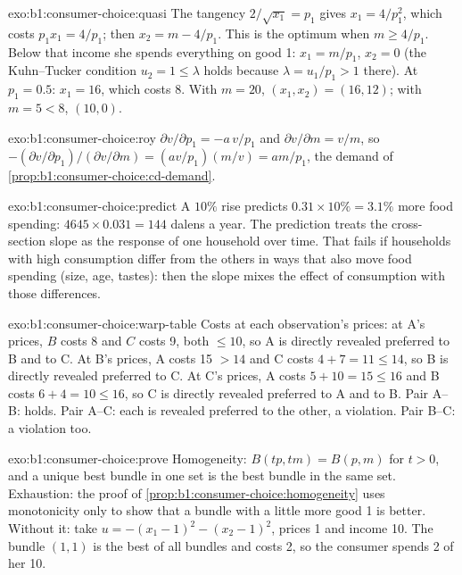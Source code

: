 \begin{solution}{exo:b1:consumer-choice:quasi}
The tangency $2/\sqrt{x_1} = p_1$ gives $x_1 = 4/p_1^2$, which costs
$p_1x_1 = 4/p_1$; then $x_2 = m - 4/p_1$. This is the optimum when
$m \ge 4/p_1$. Below that income she spends everything on good 1:
$x_1 = m/p_1$, $x_2 = 0$ (the Kuhn--Tucker condition $u_2 = 1 \le \lambda$ holds
because $\lambda = u_1/p_1 > 1$ there). At $p_1 = 0.5$: $x_1 = 16$, which costs 8.
With $m = 20$, $(x_1, x_2) = (16, 12)$; with $m = 5 < 8$, $(10, 0)$.
\end{solution}

\begin{solution}{exo:b1:consumer-choice:roy}
$\partial v/\partial p_1 = -a\,v/p_1$ and $\partial v/\partial m = v/m$, so
$-(\partial v/\partial p_1)/(\partial v/\partial m) = (av/p_1)(m/v) = am/p_1$,
the demand of \cref{prop:b1:consumer-choice:cd-demand}.
\end{solution}

\begin{solution}{exo:b1:consumer-choice:predict}
A $10\%$ rise predicts $0.31 \times 10\% = 3.1\%$ more food spending:
$4645 \times 0.031 = 144$ dalens a year. The prediction treats the
cross-section slope as the response of one household over time. That
fails if households with high consumption differ from the others in ways
that also move food spending (size, age, tastes): then the slope mixes the
effect of consumption with those differences.
\end{solution}

\begin{solution}{exo:b1:consumer-choice:warp-table}
Costs at each observation's prices:
at A's prices, $B$ costs 8 and $C$ costs 9, both $\le 10$, so A is directly
revealed preferred to B and to C. At B's prices, A costs 15 $> 14$ and C
costs $4 + 7 = 11 \le 14$, so B is directly revealed preferred to C. At C's
prices, A costs $5 + 10 = 15 \le 16$ and B costs $6 + 4 = 10 \le 16$, so C is
directly revealed preferred to A and to B. Pair A--B:  holds. Pair
A--C: each is revealed preferred to the other, a violation. Pair B--C: a
violation too.
\end{solution}

\begin{solution}{exo:b1:consumer-choice:prove}
Homogeneity: $B(tp, tm) = B(p, m)$ for $t > 0$, and a unique best bundle in
one set is the best bundle in the same set. Exhaustion: the proof of
\cref{prop:b1:consumer-choice:homogeneity} uses monotonicity only to show
that a bundle with a little more good 1 is better. Without it: take
$u = -(x_1 - 1)^2 - (x_2 - 1)^2$, prices 1 and income 10. The bundle $(1, 1)$
is the best of all bundles and costs 2, so the consumer spends 2 of her 10.
\end{solution}

